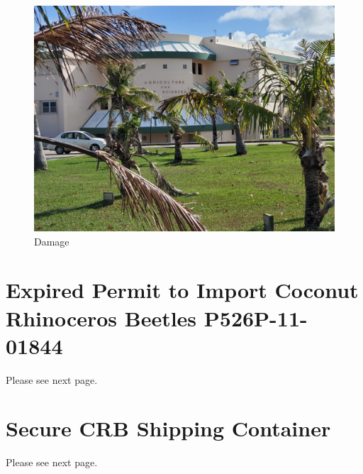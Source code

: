 \documentclass[12pt,english,letterpaper]{scrartcl}
\begin{document}
\begin{figure}[h]
	\includegraphics[width=\textwidth]{damage.jpg}
	\caption{Damage}
	\label{fig:damage}
\end{figure}

\clearpage
\appendix
\section{Expired Permit to Import Coconut Rhinoceros Beetles P526P-11-01844}\label{old permit}
Please see next page.



\section{Secure CRB Shipping Container}\label{shipping container}
Please see next page.

\end{document}
